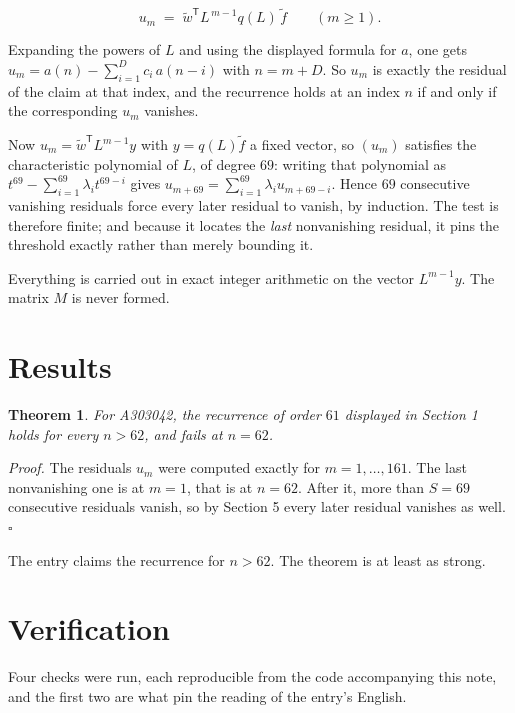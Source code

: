 \documentclass[11pt]{article}
\newtheorem{theorem}{Theorem}
\theoremstyle{definition}
\begin{document}
\[u_m \;=\; \tilde w^{\mathsf T} L^{\,m-1} q(L)\,\tilde f \qquad (m \ge 1).\]

Expanding the powers of $L$ and using the displayed formula for $a$, one gets $u_m = a(n) - \sum_{i=1}^{D} c_i\,a(n-i)$ with $n = m + D$. So $u_m$ is exactly the residual of the claim at that index, and the recurrence holds at an index $n$ if and only if the corresponding $u_m$ vanishes.

Now $u_m = \tilde w^{\mathsf T} L^{m-1} y$ with $y = q(L)\tilde f$ a fixed vector, so $(u_m)$ satisfies the characteristic polynomial of $L$, of degree $69$: writing that polynomial as $t^{69} - \sum_{i=1}^{69} \lambda_i t^{69-i}$ gives $u_{m+69} = \sum_{i=1}^{69} \lambda_i u_{m+69-i}$. Hence $69$ consecutive vanishing residuals force every later residual to vanish, by induction. The test is therefore finite; and because it locates the {\itshape last} nonvanishing residual, it pins the threshold exactly rather than merely bounding it.

Everything is carried out in exact integer arithmetic on the vector $L^{m-1}y$. The matrix $M$ is never formed.

\section{Results}

\begin{theorem} For A303042, the recurrence of order $61$ displayed in Section 1 holds for every $n > 62$, and fails at $n = 62$.\end{theorem}

{\itshape Proof.} The residuals $u_m$ were computed exactly for $m = 1,\dots,161$. The last nonvanishing one is at $m = 1$, that is at $n = 62$. After it, more than $S = 69$ consecutive residuals vanish, so by Section 5 every later residual vanishes as well. $\square$

The entry claims the recurrence for $n > 62$. The theorem is at least as strong.

\section{Verification}

Four checks were run, each reproducible from the code accompanying this note, and the first two are what pin the reading of the entry's English.
\end{document}
